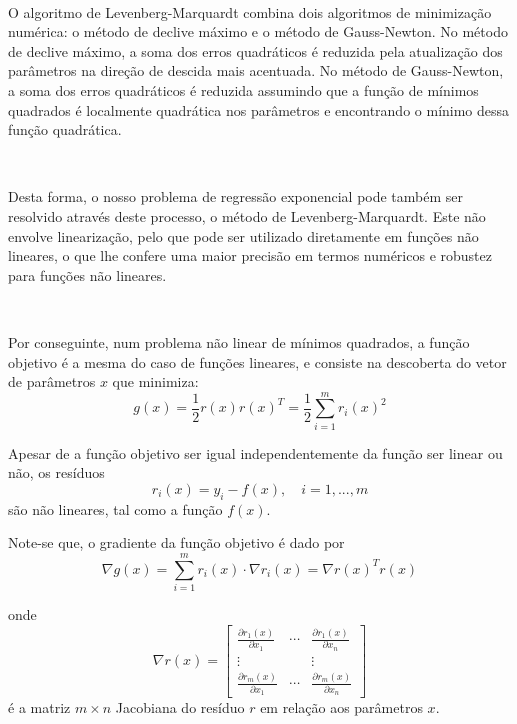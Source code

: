 \documentclass[]{article}
\numberwithin{equation}{subsection}
\begin{document}
\(\ \)

O algoritmo de Levenberg-Marquardt combina dois algoritmos de
minimização numérica: o método de declive máximo e o método de
Gauss-Newton. No método de declive máximo, a soma dos erros quadráticos
é reduzida pela atualização dos parâmetros na direção de descida mais
acentuada. No método de Gauss-Newton, a soma dos erros quadráticos é
reduzida assumindo que a função de mínimos quadrados é localmente
quadrática nos parâmetros e encontrando o mínimo dessa função
quadrática.

\(\ \)

Desta forma, o nosso problema de regressão exponencial pode também ser
resolvido através deste processo, o método de Levenberg-Marquardt. Este
não envolve linearização, pelo que pode ser utilizado diretamente em
funções não lineares, o que lhe confere uma maior precisão em termos
numéricos e robustez para funções não lineares.

\(\ \)

Por conseguinte, num problema não linear de mínimos quadrados, a função
objetivo é a mesma do caso de funções lineares, e consiste na descoberta
do vetor de parâmetros \(x\) que minimiza:
\begin{equation} \label{eq:funcao_objetivo}
g(x)=\frac{1}{2}r(x)r(x)^T=\frac{1}{2}\sum_{i=1}^{m}r_i(x)^2
\end{equation}

Apesar de a função objetivo ser igual independentemente da função ser
linear ou não, os resíduos \begin{equation}
r_i(x)=y_i-f(x), \quad  i=1,...,m
\end{equation} são não lineares, tal como a função \(f(x)\).

Note-se que, o gradiente da função objetivo é dado por \begin{equation}
\nabla g(x) = \sum_{i=1}^{m}r_i(x) \cdot \nabla r_i(x) = \nabla r(x)^Tr(x)
\end{equation}

onde \begin{equation}
\nabla r(x)=\begin{bmatrix}
\frac{\partial r_1(x)}{\partial x_1} & \cdots & \frac{\partial r_1(x)}{\partial x_n} \\
\vdots &  & \vdots \\
\frac{\partial r_m(x)}{\partial x_1} & \cdots & \frac{\partial r_m(x)}{\partial x_n}
\end{bmatrix}
\end{equation} é a matriz \(m \times n\) Jacobiana do resíduo \(r\) em
relação aos parâmetros \(x\).
\end{document}
